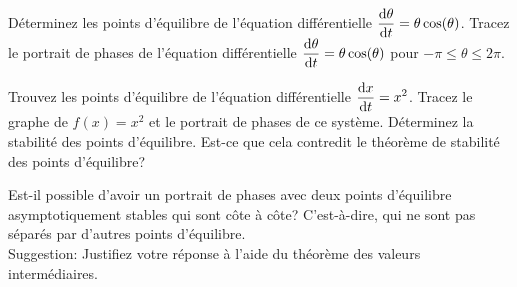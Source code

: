 \begin{question}[\life]
Déterminez les points d'équilibre de l'équation différentielle
$\displaystyle \frac{\mathrm{d}\theta}{\mathrm{d}t} = \theta\cos(\theta)$.
Tracez le portrait de phases de l'équation différentielle
$\displaystyle \frac{\mathrm{d}\theta}{\mathrm{d}t} = \theta \cos(\theta)$ pour
$-\pi \leq \theta \leq 2\pi$.
\label{10Q42}
\end{question}

\begin{question}[\life]
Trouvez les points d'équilibre de l'équation différentielle
$\displaystyle \frac{\mathrm{d}x}{\mathrm{d}t}=x^2$.  Tracez le graphe de $f(x)=x^2$ et le
portrait de phases de ce système.  Déterminez la stabilité des points
d'équilibre.  Est-ce que cela contredit le théorème de stabilité des
points d'équilibre?
\label{10Q43}
\end{question}

\begin{question}[\life\theory]
Est-il possible d'avoir un portrait de phases avec deux points
d'équilibre asymptotiquement stables qui sont côte à côte?
C'est-à-dire, qui ne sont pas séparés par d'autres points d'équilibre.\\
Suggestion: Justifiez votre réponse à l'aide du théorème des valeurs
intermédiaires.
\label{10Q44}
\end{question}

